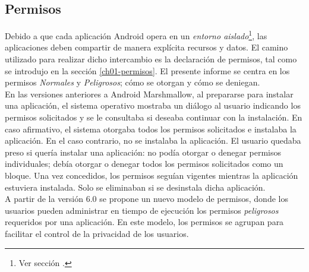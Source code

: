 \subsection{Permisos}\label{ch03-permisos}
Debido a que cada aplicación Android opera en un \emph{entorno aislado}\footnote{Ver sección .}, las aplicaciones deben compartir de manera explícita recursos y datos. El camino utilizado para realizar dicho intercambio es la declaración de permisos, tal como se introdujo en la sección \ref{ch01-permisos}. El presente informe se centra en los permisos \emph{Normales} y \emph{Peligrosos}; cómo se otorgan y cómo se deniegan.\\

En las versiones anteriores a Android Marshmallow, al prepararse para instalar una aplicación, el sistema operativo mostraba un diálogo al usuario indicando los permisos solicitados y se le consultaba si deseaba continuar con la instalación. En caso afirmativo, el sistema otorgaba todos los permisos solicitados e instalaba la aplicación. En el caso contrario, no se instalaba la aplicación. El usuario quedaba preso si quería instalar una aplicación: no podía otorgar o denegar permisos individuales; debía otorgar o denegar todos los permisos solicitados como un bloque. Una vez concedidos, los permisos seguían vigentes mientras la aplicación estuviera instalada. Solo se eliminaban si se desinstala dicha aplicación.\\

A partir de la versión 6.0 se propone un nuevo modelo de permisos, donde los usuarios pueden administrar en tiempo de ejecución los permisos \emph{peligrosos} requeridos por una aplicación. En este modelo, los permisos se agrupan para facilitar el control de la privacidad de los usuarios.\\


